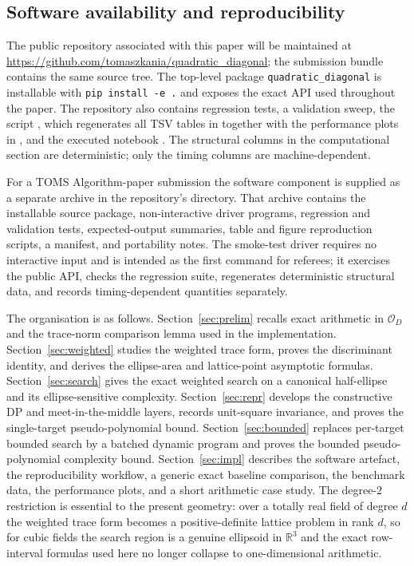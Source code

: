 \documentclass[manuscript]{acmart}
\theoremstyle{plain}
\theoremstyle{definition}
\theoremstyle{nonitalicremark}
\newcommand{\R}{\mathbb{R}}
\newcommand{\OO}{\mathcal{O}}
\newcommand{\OD}{\OO_D}
\begin{document}
\subsection*{Software availability and reproducibility}

The public repository associated with this paper will be maintained at
\url{https://github.com/tomaszkania/quadratic_diagonal}; the submission bundle contains the same
source tree. The top-level package \texttt{quadratic\_diagonal} is installable with
\texttt{pip install -e .} and exposes the exact API used throughout the paper. The repository also
contains regression tests, a validation sweep, the script ,
which regenerates all TSV tables in  together with the performance plots in
, and the executed notebook .
The structural columns in the computational section are deterministic; only the timing columns are
machine-dependent.

For a TOMS Algorithm-paper submission the software component is supplied as a separate archive in
the repository's  directory. That archive contains the installable source package,
non-interactive driver programs, regression and validation tests, expected-output summaries, table
and figure reproduction scripts, a manifest, and portability notes. The smoke-test driver
 requires no interactive input and is intended as the first command
for referees; it exercises the public API, checks the regression suite, regenerates deterministic
structural data, and records timing-dependent quantities separately.

The organisation is as follows. Section~\ref{sec:prelim} recalls exact arithmetic in $\OD$ and the
trace-norm comparison lemma used in the implementation. Section~\ref{sec:weighted} studies the
weighted trace form, proves the discriminant identity, and derives the ellipse-area and lattice-point
asymptotic formulas. Section~\ref{sec:search} gives the exact weighted search on a canonical
half-ellipse and its ellipse-sensitive complexity. Section~\ref{sec:repr} develops the constructive
DP and meet-in-the-middle layers, records unit-square invariance, and proves the single-target
pseudo-polynomial bound. Section~\ref{sec:bounded} replaces per-target bounded search by a batched
dynamic program and proves the bounded pseudo-polynomial complexity bound. Section~\ref{sec:impl}
describes the software artefact, the reproducibility workflow, a generic exact baseline comparison,
the benchmark data, the performance plots, and a short arithmetic case study. The degree-$2$
restriction is essential to the present geometry: over a totally real field of degree $d$ the
weighted trace form becomes a positive-definite lattice problem in rank $d$, so for cubic fields the
search region is a genuine ellipsoid in $\R^3$ and the exact row-interval formulas used here no
longer collapse to one-dimensional arithmetic.
\end{document}
